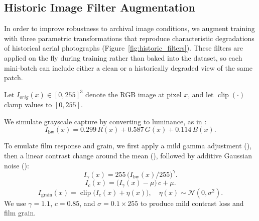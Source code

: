 
\subsection{Historic Image Filter Augmentation}
\label{subsec:historic_filters}

In order to improve robustness to archival image conditions, we augment training with three parametric transformations that reproduce characteristic degradations of historical aerial photographs (Figure~\ref{fig:historic_filters}). These filters are applied on the fly during training rather than baked into the dataset, so each mini-batch can include either a clean or a historically degraded view of the same patch.

Let $I_{orig}(x)\in[0,255]^3$ denote the RGB image at pixel $x$, and let $\operatorname{clip}(\cdot)$ clamp values to $[0,255]$.

We simulate grayscale capture by converting to luminance, as in :
\begin{equation}
I_{\text{bw}}(x) = 0.299\,R(x) + 0.587\,G(x) + 0.114\,B(x).
\label{eq:gray}
\end{equation}

To emulate film response and grain, we first apply a mild gamma adjustment (), then a linear contrast change around the mean (), followed by additive Gaussian noise ():
\begin{equation}
I_{\gamma}(x) = 255\,\big(I_{\text{bw}}(x)/255\big)^{\gamma}.
\label{eq:gamma}
\end{equation}
\begin{equation}
I_{c}(x) = \big(I_{\gamma}(x) - \mu\big)\,c + \mu.
\label{eq:contrast}
\end{equation}
\begin{equation}
I_{\text{grain}}(x) = \operatorname{clip}\big(I_{c}(x) + \eta(x)\big),\quad \eta(x)\sim\mathcal{N}(0,\sigma^2).
\label{eq:grain}
\end{equation}
We use $\gamma=1.1$, $c=0.85$, and $\sigma=0.1\times 255$ to produce mild contrast loss and film grain.

